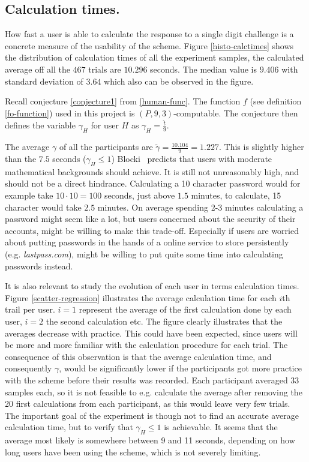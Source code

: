 \subsection{Calculation times.}
How fast a user is able to calculate the response to a single digit challenge is a concrete measure of the usability of the scheme. Figure \ref{histo-calctimes} shows the distribution of calculation times of all the experiment samples, the calculated average off all the $467$ trials are $10.296$ seconds. The median value is $9.406$ with standard deviation of $3.64$ which also can be observed in the figure. 
\par Recall conjecture \ref{conjecture1} from \autoref{human-func}. The function $f$ (see definition \ref{fo-function}) used in this project is $(P,9,3)$-computable. The conjecture then defines the variable $\gamma_H$ for user $H$ as {\Large $\gamma_H = \frac{\hat t}{9}$}. 
\par The average $\gamma$ of all the participants are $\tilde \gamma = \frac{10.104}{9} = 1.227$. This is slightly higher than the $7.5$ seconds ($\gamma_H \le 1 $) Blocki~\cite{hcp-blocki} predicts that users with moderate mathematical backgrounds should achieve. It is still not unreasonably high, and should not be a direct hindrance. Calculating a 10 character password would for example take $10 \cdot 10 = 100$ seconds, just above $1.5$ minutes, to calculate, 15 character would take $2.5$ minutes. On average spending 2-3 minutes calculating a password might seem like a lot, but users concerned about the security of their accounts, might be willing to make this trade-off. Especially if users are worried about putting passwords in the hands of a online service to store persistently (e.g. \emph{lastpass.com}), might be willing to put quite some time into calculating passwords instead.
\par It is also relevant to study the evolution of each user in terms calculation times. Figure \ref{scatter-regression} illustrates the average calculation time for each $i$th trail per user. $i=1$ represent the average of the first calculation done by each user, $i=2$ the second calculation etc. The figure clearly illustrates that the averages decrease with practice. This could have been expected, since users will be more and more familiar with the calculation procedure for each trial. The consequence of this observation is that the average calculation time, and consequently $\gamma$, would be significantly lower if the participants got more practice with the scheme before their results was recorded. Each participant averaged $33$ samples each, so it is not feasible to e.g. calculate the average after removing the 20 first calculations from each participant, as this would leave very few trials. The important goal of the experiment is though not to find an accurate average calculation time, but to verify that $\gamma_H \le 1$ is achievable. It seems that the average most likely is somewhere between 9 and 11 seconds, depending on how long users have been using the scheme, which is not severely limiting.
